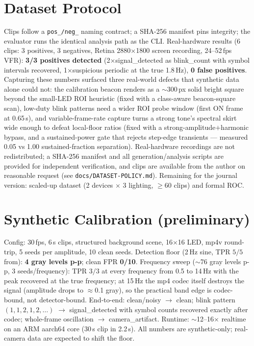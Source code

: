 \documentclass[10pt]{article}
\begin{document}
\section{Dataset Protocol}\label{sec:dataset}
Clips follow a \texttt{pos\_/neg\_} naming contract; a SHA-256 manifest pins
integrity; the evaluator runs the identical analysis path as the CLI.
Real-hardware results (6 clips: 3 positives, 3 negatives, Retina 2880$\times$1800
screen recording, 24--52\,fps VFR): \textbf{3/3 positives detected}
(2$\times$\textsf{signal\_detected} as \textsf{blink\_count} with symbol
intervals recovered, 1$\times$\textsf{suspicious} \textsf{periodic} at the true
1.8\,Hz), \textbf{0 false positives}. Capturing these numbers surfaced three
real-world defects that synthetic data alone could not: the calibration beacon
renders as a $\sim$300\,px solid bright square beyond the small-LED ROI
heuristic (fixed with a class-aware beacon-square scan), low-duty blink
patterns need a wider ROI probe window (first ON frame at 0.65\,s), and
variable-frame-rate capture turns a strong tone's spectral skirt wide enough
to defeat local-floor ratios (fixed with a strong-amplitude$+{}$harmonic
bypass, and a sustained-power gate that rejects step-edge transients ---
measured 0.05 vs 1.00 sustained-fraction separation). Real-hardware recordings
are not redistributed; a SHA-256 manifest and all generation/analysis scripts
are provided for independent verification, and clips are available from the
author on reasonable request (see \texttt{docs/DATASET-POLICY.md}). Remaining
for the journal version: scaled-up dataset (2 devices $\times$ 3 lighting,
$\ge$60 clips) and formal ROC.

\section{Synthetic Calibration (preliminary)}
Config: 30\,fps, 6\,s clips, structured background scene, 16$\times$16 LED,
mp4v round-trip, 5 seeds per amplitude, 10 clean seeds. Detection floor
(2\,Hz sine, TPR $5/5$ from): \textbf{4 gray levels p-p}; clean FPR
\textbf{0/10}. Frequency sweep ($\sim$76 gray levels p-p, 3 seeds/frequency):
TPR $3/3$ at every frequency from 0.5 to 14\,Hz with the peak recovered at the
true frequency; at 15\,Hz the mp4 codec itself destroys the signal (amplitude
drops to $\approx$0.1 gray), so the practical band edge is codec-bound, not
detector-bound. End-to-end: clean/noisy $\rightarrow$ clean; blink pattern
$(1,1,2,1,2,\dots)$ $\rightarrow$ \textsf{signal\_detected} with symbol counts
recovered exactly after codec; whole-frame oscillation $\rightarrow$
\textsf{camera\_artifact}. Runtime: $\sim$12--16$\times$ realtime on an
ARM aarch64 core (30\,s clip in 2.2\,s). All numbers are synthetic-only;
real-camera data are expected to shift the floor.
\end{document}
